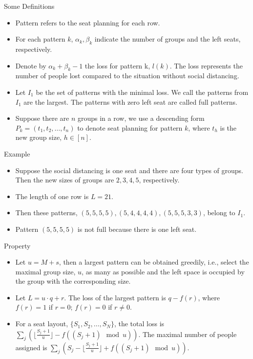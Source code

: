   \begin{frame}{Some Definitions}
    \begin{itemize}
      \item Pattern refers to the seat planning for each row.
      \item For each pattern $k$, $\alpha_k, \beta_k$ indicate the number of groups and the left seats, respectively.
      \item Denote by $\alpha_k + \beta_k- 1$ the loss for pattern k, $l(k)$. The loss represents the number of people lost compared to the situation without social distancing.
      \item Let $I_1$ be the set of patterns with the minimal loss. We call the patterns from $I_1$ are the largest. The patterns with zero left seat are called full patterns.
      \item Suppose there are $n$ groups in a row, we use a descending form $P_{k} = (t_1, t_2, \ldots, t_n)$ to denote seat planning for pattern $k$, where $t_h$ is the new group size, $h \in [n]$.
    \end{itemize}
  \end{frame}

  \begin{frame}{Example}
    \begin{itemize}
      \item Suppose the social distancing is one seat and there are four types of groups. Then the new sizes of groups are $2, 3, 4, 5$, respectively. 
      \item The length of one row is $L = 21$.
      \item Then these patterns, $(5, 5, 5, 5), (5, 4, 4, 4, 4),(5, 5, 5, 3, 3)$, belong to $I_1$.
      \item Pattern $(5, 5, 5, 5)$ is not full because there is one left seat.
    \end{itemize}
  \end{frame}

  \begin{frame}{Property}
    \begin{itemize}
      \item Let $u = M + s$, then a largest pattern can be obtained greedily, i.e., select the maximal group size, $u$, as many as possible and the left space is occupied by the group with the corresponding size. 
      \item Let $L = u\cdot q + r$. The loss of the largest pattern is $q - f(r)$, where $f(r) =1$ if $r=0$; $f(r) =0$ if $r \neq 0$.
      \item For a seat layout, $\{S_1, S_2, \ldots, S_{N}\}$, the total loss is $\sum_{j} (\lfloor \frac{S_j+1}{u} \rfloor - f((S_j +1)\mod u))$. The maximal number of people assigned is $\sum_{j} (S_j - \lfloor \frac{S_j+1}{u} \rfloor + f((S_j +1)\mod u))$.
      
    \end{itemize}
  \end{frame}
  
